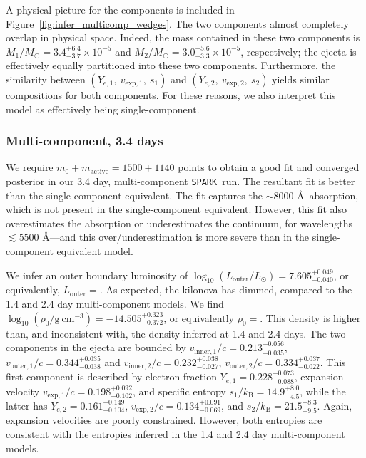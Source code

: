\documentclass[twocolumn, twocolappendix]{aastex63}
\def\SPARK{\texttt{SPARK}}
\begin{document}
A physical picture for the components is included in Figure~\ref{fig:infer_multicomp_wedges}. The two components almost completely overlap in physical space. Indeed, the mass contained in these two components is $M_1/M_{\odot} = 3.4^{+6.4}_{-3.7} \times 10^{-5}$ and $M_2/M_{\odot} = 3.0^{+5.6}_{-3.3} \times 10^{-5}$, respectively; the ejecta is effectively equally partitioned into these two components. Furthermore, the similarity between $(Y_{e,1},~v_{\mathrm{exp},1},~s_1)$ and $(Y_{e,2},~v_{\mathrm{exp},2},~s_2)$ yields similar compositions for both components. For these reasons, we also interpret this model as effectively being single-component.



\subsubsection{Multi-component, 3.4 days}\label{sssc:3.4_multi}

We require $m_0 + m_{\mathrm{active}} = 1500 + 1140$ points to obtain a good fit and converged posterior in our 3.4 day, multi-component \SPARK~run. The resultant fit is better than the single-component equivalent. The fit captures the $\sim 8000$ \AA~absorption, which is not present in the single-component equivalent. However, this fit also overestimates the absorption or underestimates the continuum, for wavelengths $\lesssim 5500$ \AA---and this over/underestimation is more severe than in the single-component equivalent model.  

We infer an outer boundary luminosity of $\log_{10} (L_{\mathrm{outer}}/L_{\odot}) = 7.605^{+0.049}_{-0.040}$, or equivalently, $L_{\mathrm{outer}} = $. As expected, the kilonova has dimmed, compared to the 1.4 and 2.4 day multi-component models. We find $\log_{10} (\rho_0 / \mathrm{g~cm^{-3}}) = -14.505^{+0.323}_{-0.372}$, or equivalently $\rho_0 = $. This density is higher than, and inconsistent with, the density inferred at 1.4 and 2.4 days. The two components in the ejecta are bounded by $v_{\mathrm{inner,1}}/c = 0.213^{+0.056}_{-0.035}$, $v_{\mathrm{outer,1}}/c = 0.344^{+0.035}_{-0.038}$ and $v_{\mathrm{inner,2}}/c = 0.232^{+0.038}_{-0.027}$, $v_{\mathrm{outer,2}}/c = 0.334^{+0.037}_{-0.022}$. This first component is described by electron fraction $Y_{e,1} = 0.228^{+0.073}_{-0.088}$, expansion velocity $v_{\mathrm{exp},1}/c = 0.198^{+0.092}_{-0.102}$, and specific entropy $s_1 / k_{\mathrm{B}} = 14.9^{+8.0}_{-4.5}$, while the latter has $Y_{e,2} = 0.161^{+0.149}_{-0.104}$, $v_{\mathrm{exp},2}/c = 0.134^{+0.091}_{-0.069}$, and $s_2 / k_{\mathrm{B}} = 21.5^{+8.3}_{-9.5}$. Again, expansion velocities are poorly constrained. However, both entropies are consistent with the entropies inferred in the 1.4 and 2.4 day multi-component models. 
\end{document}
